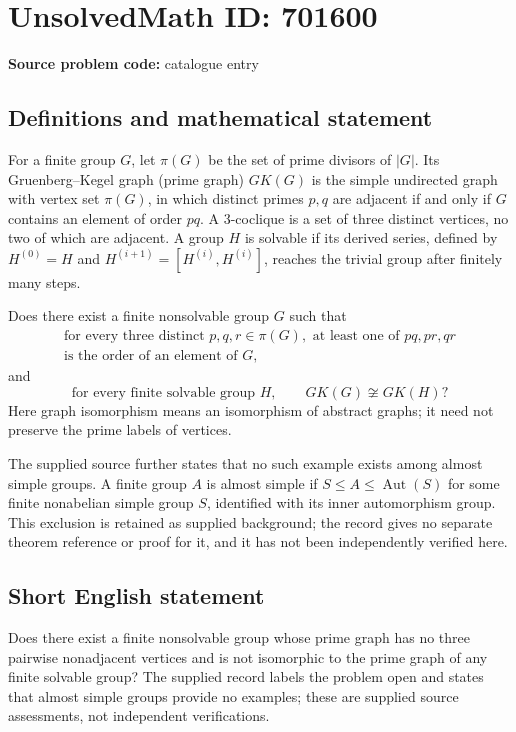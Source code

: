 \documentclass[11pt]{article}
\begin{document}
\section*{UnsolvedMath ID: 701600}
\textbf{Source problem code:} catalogue entry
\subsection{Definitions and mathematical statement}
For a finite group \(G\), let \(\pi(G)\) be the set of prime divisors of \(|G|\). Its Gruenberg--Kegel graph (prime graph) \(GK(G)\) is the simple undirected graph with vertex set \(\pi(G)\), in which distinct primes \(p,q\) are adjacent if and only if \(G\) contains an element of order \(pq\). A \(3\)-coclique is a set of three distinct vertices, no two of which are adjacent. A group \(H\) is solvable if its derived series, defined by \(H^{(0)}=H\) and \(H^{(i+1)}=[H^{(i)},H^{(i)}]\), reaches the trivial group after finitely many steps.

Does there exist a finite nonsolvable group \(G\) such that
\[
\begin{gathered}
\text{for every three distinct }p,q,r\in\pi(G),\text{ at least one of }pq,pr,qr\\
\text{is the order of an element of }G,
\end{gathered}
\]
and
\[
\text{for every finite solvable group }H,\qquad GK(G)\not\cong GK(H)?
\]
Here graph isomorphism means an isomorphism of abstract graphs; it need not preserve the prime labels of vertices.

The supplied source further states that no such example exists among almost simple groups. A finite group \(A\) is almost simple if \(S\leq A\leq\operatorname{Aut}(S)\) for some finite nonabelian simple group \(S\), identified with its inner automorphism group. This exclusion is retained as supplied background; the record gives no separate theorem reference or proof for it, and it has not been independently verified here.
\subsection{Short English statement}
Does there exist a finite nonsolvable group whose prime graph has no three pairwise nonadjacent vertices and is not isomorphic to the prime graph of any finite solvable group? The supplied record labels the problem open and states that almost simple groups provide no examples; these are supplied source assessments, not independent verifications.
\end{document}
